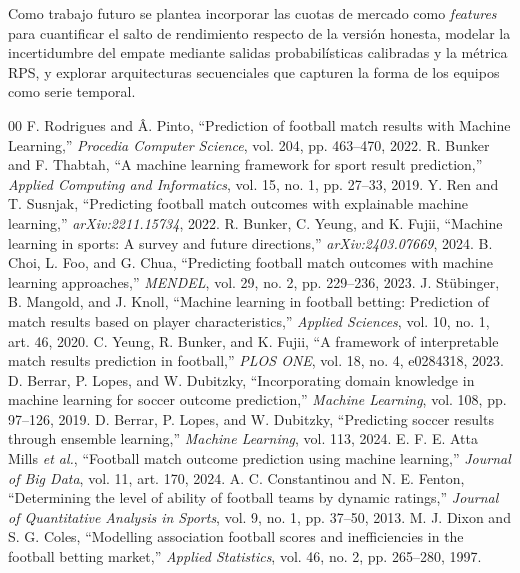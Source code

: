 \documentclass[conference]{IEEEtran}
\begin{document}
Como trabajo futuro se plantea incorporar las cuotas de mercado como \emph{features} para
cuantificar el salto de rendimiento respecto de la versi\'on honesta, modelar la
incertidumbre del empate mediante salidas probabil\'isticas calibradas y la m\'etrica RPS,
y explorar arquitecturas secuenciales que capturen la forma de los equipos como serie
temporal.

\begin{thebibliography}{00}
 F. Rodrigues and \^A. Pinto, ``Prediction of football match results with Machine Learning,'' \emph{Procedia Computer Science}, vol. 204, pp. 463--470, 2022.
 R. Bunker and F. Thabtah, ``A machine learning framework for sport result prediction,'' \emph{Applied Computing and Informatics}, vol. 15, no. 1, pp. 27--33, 2019.
 Y. Ren and T. Susnjak, ``Predicting football match outcomes with explainable machine learning,'' \emph{arXiv:2211.15734}, 2022.
 R. Bunker, C. Yeung, and K. Fujii, ``Machine learning in sports: A survey and future directions,'' \emph{arXiv:2403.07669}, 2024.
 B. Choi, L. Foo, and G. Chua, ``Predicting football match outcomes with machine learning approaches,'' \emph{MENDEL}, vol. 29, no. 2, pp. 229--236, 2023.
 J. St\"ubinger, B. Mangold, and J. Knoll, ``Machine learning in football betting: Prediction of match results based on player characteristics,'' \emph{Applied Sciences}, vol. 10, no. 1, art. 46, 2020.
 C. Yeung, R. Bunker, and K. Fujii, ``A framework of interpretable match results prediction in football,'' \emph{PLOS ONE}, vol. 18, no. 4, e0284318, 2023.
 D. Berrar, P. Lopes, and W. Dubitzky, ``Incorporating domain knowledge in machine learning for soccer outcome prediction,'' \emph{Machine Learning}, vol. 108, pp. 97--126, 2019.
 D. Berrar, P. Lopes, and W. Dubitzky, ``Predicting soccer results through ensemble learning,'' \emph{Machine Learning}, vol. 113, 2024.
 E. F. E. Atta Mills \emph{et al.}, ``Football match outcome prediction using machine learning,'' \emph{Journal of Big Data}, vol. 11, art. 170, 2024.
 A. C. Constantinou and N. E. Fenton, ``Determining the level of ability of football teams by dynamic ratings,'' \emph{Journal of Quantitative Analysis in Sports}, vol. 9, no. 1, pp. 37--50, 2013.
 M. J. Dixon and S. G. Coles, ``Modelling association football scores and inefficiencies in the football betting market,'' \emph{Applied Statistics}, vol. 46, no. 2, pp. 265--280, 1997.

\end{thebibliography}
\end{document}
